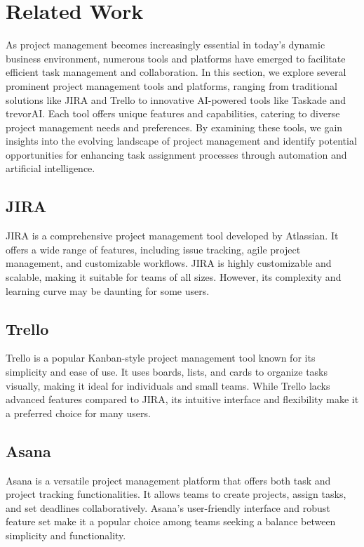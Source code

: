 \documentclass[conference]{IEEEtran}
\begin{document}
\section{Related Work}
As project management becomes increasingly essential in today's dynamic business environment, numerous tools and platforms have emerged to facilitate efficient task management and collaboration. In this section, we explore several prominent project management tools and platforms, ranging from traditional solutions like JIRA and Trello to innovative AI-powered tools like Taskade and trevorAI. Each tool offers unique features and capabilities, catering to diverse project management needs and preferences. By examining these tools, we gain insights into the evolving landscape of project management and identify potential opportunities for enhancing task assignment processes through automation and artificial intelligence.

\subsection{JIRA}
JIRA is a comprehensive project management tool developed by Atlassian. It offers a wide range of features, including issue tracking, agile project management, and customizable workflows. JIRA is highly customizable and scalable, making it suitable for teams of all sizes. However, its complexity and learning curve may be daunting for some users.

\subsection{Trello}
Trello is a popular Kanban-style project management tool known for its simplicity and ease of use. It uses boards, lists, and cards to organize tasks visually, making it ideal for individuals and small teams. While Trello lacks advanced features compared to JIRA, its intuitive interface and flexibility make it a preferred choice for many users.

\subsection{Asana}
Asana is a versatile project management platform that offers both task and project tracking functionalities. It allows teams to create projects, assign tasks, and set deadlines collaboratively. Asana's user-friendly interface and robust feature set make it a popular choice among teams seeking a balance between simplicity and functionality.
\end{document}

